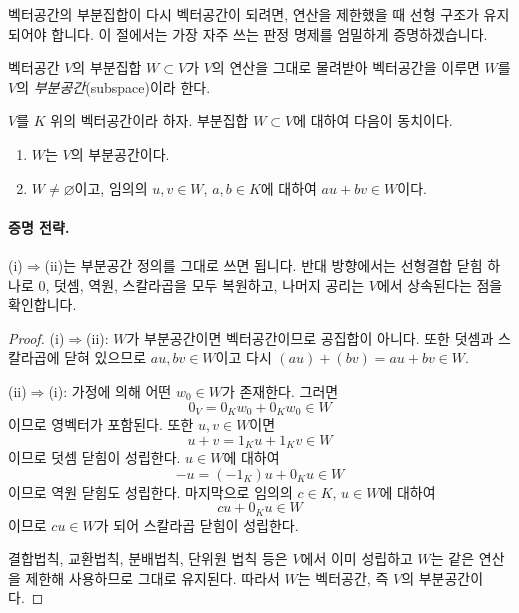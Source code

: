 
벡터공간의 부분집합이 다시 벡터공간이 되려면, 연산을 제한했을 때 선형 구조가 유지되어야 합니다. 이 절에서는 가장 자주 쓰는 판정 명제를 엄밀하게 증명하겠습니다.

\begin{definition}
벡터공간 $V$의 부분집합 $W\subset V$가 $V$의 연산을 그대로 물려받아 벡터공간을 이루면 $W$를 $V$의 \emph{부분공간}(subspace)이라 한다.
\end{definition}

\begin{theorem}
$V$를 $K$ 위의 벡터공간이라 하자. 부분집합 $W\subset V$에 대하여 다음이 동치이다.
\begin{enumerate}[label=(\roman*)]
\item $W$는 $V$의 부분공간이다.
\item $W\neq\varnothing$이고, 임의의 $u,v\in W$, $a,b\in K$에 대하여 $au+bv\in W$이다.
\end{enumerate}
\end{theorem}

\paragraph{증명 전략.}
(i)$\Rightarrow$(ii)는 부분공간 정의를 그대로 쓰면 됩니다. 반대 방향에서는 선형결합 닫힘 하나로 $0$, 덧셈, 역원, 스칼라곱을 모두 복원하고, 나머지 공리는 $V$에서 상속된다는 점을 확인합니다.

\begin{proof}
(i)$\Rightarrow$(ii): $W$가 부분공간이면 벡터공간이므로 공집합이 아니다. 또한 덧셈과 스칼라곱에 닫혀 있으므로 $au, bv\in W$이고 다시 $(au)+(bv)=au+bv\in W$.

(ii)$\Rightarrow$(i): 가정에 의해 어떤 $w_0\in W$가 존재한다. 그러면
\[
0_V=0_Kw_0+0_Kw_0\in W
\]
이므로 영벡터가 포함된다. 또한 $u,v\in W$이면
\[
u+v=1_Ku+1_Kv\in W
\]
이므로 덧셈 닫힘이 성립한다. $u\in W$에 대하여
\[
-u=(-1_K)u+0_Ku\in W
\]
이므로 역원 닫힘도 성립한다. 마지막으로 임의의 $c\in K$, $u\in W$에 대하여
\[
cu+0_Ku\in W
\]
이므로 $cu\in W$가 되어 스칼라곱 닫힘이 성립한다.

결합법칙, 교환법칙, 분배법칙, 단위원 법칙 등은 $V$에서 이미 성립하고 $W$는 같은 연산을 제한해 사용하므로 그대로 유지된다. 따라서 $W$는 벡터공간, 즉 $V$의 부분공간이다.
\end{proof}

